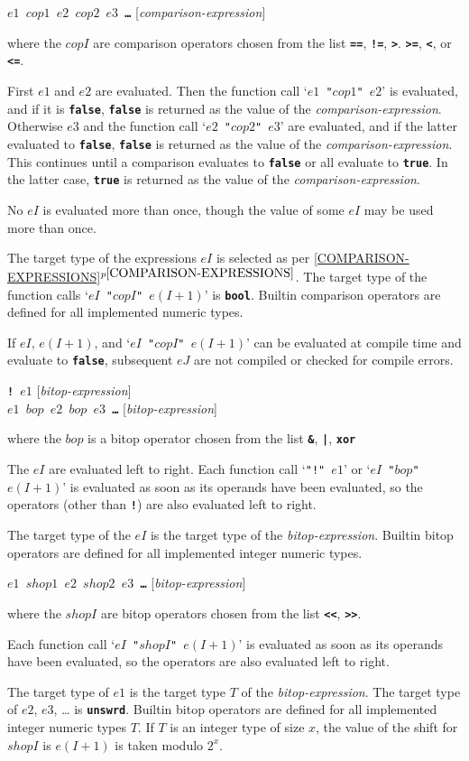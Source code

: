 \documentclass[12pt]{article}
\newcommand{\TT}[1]{{\tt \bfseries #1}}
\newcommand{\itemref}[1]{\ref{#1}$^{p\pageref{#1}}$}
\newenvironment{indpar}[1][0.3in]%
	{\begin{list}{}%
		     {\setlength{\itemsep}{0in}%
		      \setlength{\topsep}{0in}%
		      \setlength{\parsep}{1ex}%
		      \setlength{\labelwidth}{#1}%
		      \setlength{\leftmargin}{#1}%
		      \addtolength{\leftmargin}{\labelsep}}%
	 \item}%
	{\end{list}}
\begin{document}
\TT{$e1$ $cop1$ $e2$ $cop2$ $e3$ \ldots{}}
\hfill [{\em comparison-expression}]
\begin{indpar}
where the $copI$ are comparison operators chosen from the list
\TT{==}, \TT{!=}, \TT{>}. \TT{>=}, \TT{<}, or \TT{<=}.

First $e1$ and $e2$ are evaluated.  Then the function call
`{\tt $e1$ "$cop1$" $e2$}'
is evaluated, and if it is \TT{false},
\TT{false} is returned as the value of the {\em comparison-expression}.
Otherwise $e3$ and the function call `{\tt $e2$ "$cop2$" $e3$}'
are evaluated, and if the latter
evaluated to \TT{false},
\TT{false} is returned as the value of the {\em comparison-expression}.
This continues until a comparison evaluates to \TT{false} or all
evaluate to \TT{true}.  In the latter case, \TT{true} is returned as
the value of the {\em comparison-expression}.

No $eI$ is evaluated more than once, though the value of some $eI$
may be used more than once.

The target type of the expressions $eI$ is selected as
per \itemref{COMPARISON-EXPRESSIONS}.  The target type of the
function calls `{\tt $eI$ "$copI$" $e(I+1)$}' is \TT{bool}.
Builtin comparison operators are defined for all implemented
numeric types.

If $eI$, $e(I+1)$, and `{\tt $eI$ "$copI$" $e(I+1)$}' can be evaluated
at compile time and evaluate to \TT{false}, subsequent
$eJ$ are not compiled or checked for compile errors.
\end{indpar}

\TT{! $e1$}
\hfill [{\em bitop-expression}] \\
\TT{$e1$ $bop$ $e2$ $bop$ $e3$ \ldots{}}
\hfill [{\em bitop-expression}]
\begin{indpar}
where the $bop$ is a bitop operator chosen from the list
\TT{\&}, \TT{|}, \TT{xor}

The $eI$ are evaluated left to right.
Each function call
`{\tt "!" $e1$}' or
`{\tt $eI$ "$bop$" $e(I+1)$}' is evaluated as soon as its operands have
been evaluated, so the operators (other than \TT{!}) are
also evaluated left to right.

The target type of the $eI$ is the target type of the
{\em bitop-expression}.  Builtin bitop operators are defined
for all implemented integer numeric types.
\end{indpar}

\TT{$e1$ $shop1$ $e2$ $shop2$ $e3$ \ldots{}}
\hfill [{\em bitop-expression}]
\begin{indpar}
where the $shopI$ are bitop operators chosen from the list
\TT{<{}<}, \TT{>{}>}.

Each function call
`{\tt $eI$ "$shopI$" $e(I+1)$}' is evaluated as soon as its operands have
been evaluated, so the operators are
also evaluated left to right.

The target type of $e1$ is the target type $T$ of the
{\em bitop-expression}.
The target type of $e2$, $e3$, \ldots{} is \TT{unswrd}.
Builtin bitop operators are defined
for all implemented integer numeric types $T$.
If $T$ is an integer type of size $x$,
the value of the shift for $shopI$
is $e(I+1)$ is taken modulo $2^x$.
\end{indpar}
\end{document}
